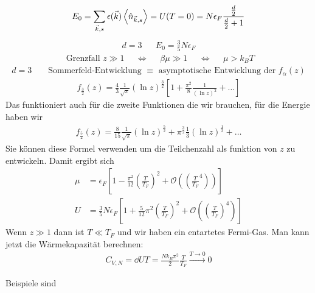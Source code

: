 %
%
\begin{align*}
  E_0 = \sum_{\vec{k},s}^{} \epsilon(\vec{k}) \Braket{\hat{n}_{\vec{k},s}}
= U(T = 0)  = N \epsilon_F
\frac{\frac{d}{2}}{\frac{d}{2} + 1}
\end{align*}
%
%
\begin{align*}
  d = 3 && E_0 = \frac{3}{5} N \epsilon_F
\end{align*}
%
%
\begin{align*}
  \text{ Grenzfall } z \gg 1 && \iff && \beta \mu \gg 1
  && \iff && \mu > k_B T
\end{align*}
%
%
\begin{align*}
  d = 3 && \text{ Sommerfeld-Entwicklung } \equiv \text{ asymptotische Entwicklung 
der } f_\alpha(z)
\end{align*}
%
%
\begin{align*}
  f_{\frac{3}{2}} (z) = \frac{4}{3} \frac{1}{\sqrt{\pi}}
  (\ln{ z}) ^{\frac{3}{2}} \left[ 1 + \frac{\pi^2}{8}
  \frac{1}{(\ln{z})^2} + \ldots \right]
\end{align*}
%
Das funktioniert auch für die zweite Funktionen die wir brauchen, 
für die Energie haben wir
%
\begin{align*}
  f_{\frac{5}{2}} (z) = \frac{8}{15} \frac{1}{\sqrt{\pi}} (\ln{z})^{\frac{5}{2}}
  + \pi^{\frac{3}{2}}\frac{1}{3} (\ln{z})^{\frac{1}{2}} + \ldots 
\end{align*}
%
Sie können diese Formel verwenden um die Teilchenzahl als funktion von 
$z$ zu entwickeln. Damit ergibt sich
%
\begin{align*}
  \mu & = \epsilon_F \left[  1- \frac{\pi^2}{12} \left( \frac{T}{T_F} \right)^2
  + \mathcal{O}\left( \left( \frac{T}{T_F}^4 \right) \right)\right] \\
  U & = \frac{3}{5} N \epsilon_F \left[ 1 + \frac{5}{12} \pi^2 \left( \frac{T }{T_F} \right)^{2} 
+ \mathcal{O}\left( \left( \frac{T}{T_F} \right)^4 \right)\right]
\end{align*}
%
Wenn $z \gg 1$ dann ist $T \ll T_F$ und wir haben ein entartetes Fermi-Gas.
Man kann jetzt die Wärmekapazität berechnen:
%
\begin{align*}
  C_{V, N} = \dd{U}{T} = \frac{N  k_B \pi^2}{2} \frac{T }{T_F} \xrightarrow{T\to 0} 0
\end{align*}
%

Beispiele sind 







